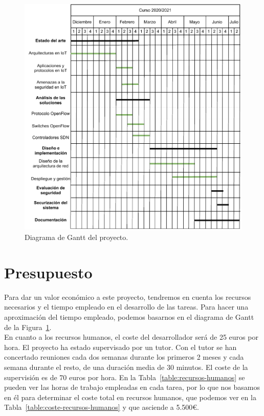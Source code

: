 \begin{figure}[t!]
    \centering
    \includegraphics[width=1\textwidth]{imagenes/cap2/gannt.pdf}
    \caption{Diagrama de Gantt del proyecto.}
    \label{fig:gantt}
\end{figure}

\section{Presupuesto}

Para dar un valor económico a este proyecto, tendremos en cuenta los recursos necesarios y el tiempo empleado en el desarrollo de las tareas. Para hacer una aproximación del tiempo empleado, podemos basarnos en el diagrama de Gantt de la Figura~\ref{fig:gantt}.\\

En cuanto a los recursos humanos, el coste del desarrollador será de 25 euros por hora. El proyecto ha estado supervisado por un tutor. Con el tutor se han concertado reuniones cada dos semanas durante los primeros 2 meses y cada semana durante el resto, de una duración media de 30 minutos. El coste de la supervisión es de 70 euros por hora. En la Tabla~\ref{table:recursos-humanos} se pueden ver las horas de trabajo empleadas en cada tarea, por lo que nos basamos en él para determinar el coste total en recursos humanos, que podemos ver en la Tabla~\ref{table:coste-recursos-humanos} y que asciende a 5.500\euro.\\

